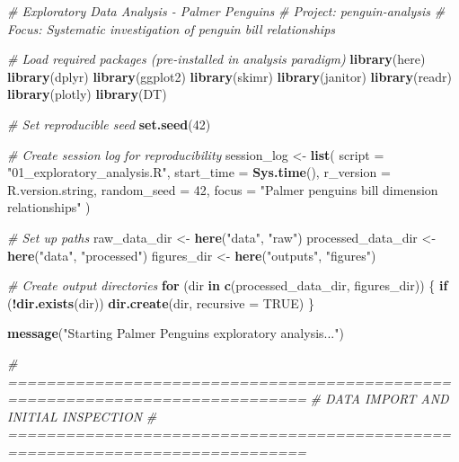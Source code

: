 \documentclass[
]{article}
\newenvironment{Shaded}{\begin{snugshade}}{\end{snugshade}}
\newcommand{\AttributeTok}[1]{\textcolor[rgb]{0.13,0.29,0.53}{#1}}
\newcommand{\CommentTok}[1]{\textcolor[rgb]{0.56,0.35,0.01}{\textit{#1}}}
\newcommand{\ConstantTok}[1]{\textcolor[rgb]{0.56,0.35,0.01}{#1}}
\newcommand{\ControlFlowTok}[1]{\textcolor[rgb]{0.13,0.29,0.53}{\textbf{#1}}}
\newcommand{\DecValTok}[1]{\textcolor[rgb]{0.00,0.00,0.81}{#1}}
\newcommand{\FunctionTok}[1]{\textcolor[rgb]{0.13,0.29,0.53}{\textbf{#1}}}
\newcommand{\NormalTok}[1]{#1}
\newcommand{\OtherTok}[1]{\textcolor[rgb]{0.56,0.35,0.01}{#1}}
\newcommand{\SpecialCharTok}[1]{\textcolor[rgb]{0.81,0.36,0.00}{\textbf{#1}}}
\newcommand{\StringTok}[1]{\textcolor[rgb]{0.31,0.60,0.02}{#1}}
\begin{document}
\begin{Shaded}
\begin{Highlighting}[]
\CommentTok{\# Exploratory Data Analysis {-} Palmer Penguins}
\CommentTok{\# Project: penguin{-}analysis}
\CommentTok{\# Focus: Systematic investigation of penguin bill relationships}

\CommentTok{\# Load required packages (pre{-}installed in analysis paradigm)}
\FunctionTok{library}\NormalTok{(here)}
\FunctionTok{library}\NormalTok{(dplyr)}
\FunctionTok{library}\NormalTok{(ggplot2)}
\FunctionTok{library}\NormalTok{(skimr)}
\FunctionTok{library}\NormalTok{(janitor)}
\FunctionTok{library}\NormalTok{(readr)}
\FunctionTok{library}\NormalTok{(plotly)}
\FunctionTok{library}\NormalTok{(DT)}

\CommentTok{\# Set reproducible seed}
\FunctionTok{set.seed}\NormalTok{(}\DecValTok{42}\NormalTok{)}

\CommentTok{\# Create session log for reproducibility}
\NormalTok{session\_log }\OtherTok{\textless{}{-}} \FunctionTok{list}\NormalTok{(}
  \AttributeTok{script =} \StringTok{"01\_exploratory\_analysis.R"}\NormalTok{,}
  \AttributeTok{start\_time =} \FunctionTok{Sys.time}\NormalTok{(),}
  \AttributeTok{r\_version =}\NormalTok{ R.version.string,}
  \AttributeTok{random\_seed =} \DecValTok{42}\NormalTok{,}
  \AttributeTok{focus =} \StringTok{"Palmer penguins bill dimension relationships"}
\NormalTok{)}

\CommentTok{\# Set up paths}
\NormalTok{raw\_data\_dir }\OtherTok{\textless{}{-}} \FunctionTok{here}\NormalTok{(}\StringTok{"data"}\NormalTok{, }\StringTok{"raw"}\NormalTok{)}
\NormalTok{processed\_data\_dir }\OtherTok{\textless{}{-}} \FunctionTok{here}\NormalTok{(}\StringTok{"data"}\NormalTok{, }\StringTok{"processed"}\NormalTok{)}
\NormalTok{figures\_dir }\OtherTok{\textless{}{-}} \FunctionTok{here}\NormalTok{(}\StringTok{"outputs"}\NormalTok{, }\StringTok{"figures"}\NormalTok{)}

\CommentTok{\# Create output directories}
\ControlFlowTok{for}\NormalTok{ (dir }\ControlFlowTok{in} \FunctionTok{c}\NormalTok{(processed\_data\_dir, figures\_dir)) \{}
  \ControlFlowTok{if}\NormalTok{ (}\SpecialCharTok{!}\FunctionTok{dir.exists}\NormalTok{(dir)) }\FunctionTok{dir.create}\NormalTok{(dir, }\AttributeTok{recursive =} \ConstantTok{TRUE}\NormalTok{)}
\NormalTok{\}}

\FunctionTok{message}\NormalTok{(}\StringTok{"Starting Palmer Penguins exploratory analysis..."}\NormalTok{)}

\CommentTok{\# =============================================================================}
\CommentTok{\# DATA IMPORT AND INITIAL INSPECTION}
\CommentTok{\# =============================================================================}


\end{Highlighting}
\end{Shaded}
\end{document}
